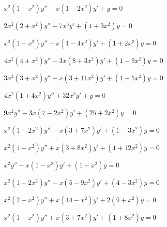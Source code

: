 \begin{exerciselist}
  \item\label{exer:7.6.31} $x^{2}(1+x^{2})y''-x(1-2x^{2})y'+y=0$

  \item\label{exer:7.6.32} $2x^{2}(2+x^{2})y''+7x^{3}y'+(1+3x^{2})y=0$

  \item\label{exer:7.6.33} $x^{2}(1+x^{2})y''-x(1-4x^{2})y'+(1+2x^{2})y=0$

  \item\label{exer:7.6.34} $4x^{2}(4+x^{2})y''+3x(8+3x^{2})y'+(1-9x^{2})y=0$

  \item\label{exer:7.6.35} $3x^{2}(3+x^{2})y''+x(3+11x^{2})y'+(1+5x^{2})y=0$

  \item\label{exer:7.6.36} $4x^{2}(1+4x^{2})y''+32x^{3}y'+y=0$

  \item\label{exer:7.6.37} $9x^{2}y''-3x(7-2x^{2})y'+(25+2x^{2})y=0$

  \item\label{exer:7.6.38} $x^{2}(1+2x^{2})y''+x(3+7x^{2})y'+(1-3x^{2})y=0$


  \item\label{exer:7.6.39} \Cex $x^{2}(1+x^{2})y''+x(3+8x^{2})y'+(1+12x^{2})y=0$

  \item\label{exer:7.6.40} \Cex $x^{2}y''-x(1-x^{2})y'+(1+x^{2})y=0$

  \item\label{exer:7.6.41} \Cex $x^{2}(1-2x^{2})y''+x(5-9x^{2})y'+(4-3x^{2})y=0$

  \item\label{exer:7.6.42} \Cex $x^{2}(2+x^{2})y''+x(14-x^{2})y'+2(9+x^{2})y=0$

  \item\label{exer:7.6.43} \Cex $x^{2}(1+x^{2})y''+x(3+7x^{2})y'+(1+8x^{2})y=0$



\end{exerciselist}
